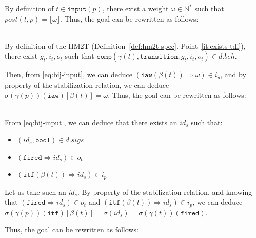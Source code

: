 \begin{itemize}
\begin{enumerate}
   \noindent{}By definition of $t\in{}\mathtt{input}(p)$, there exist
   a weight $\omega\in\mathbb{N}^{*}$ such that
   $post(t,p)=\lfloor\omega\rfloor$.  Thus, the goal can be rewritten
   as follows:
        
   \\

   By definition of the HM2T (Definition~\ref{def:hm2t-spec},
   Point~\ref{it:exists-tdi}), there exist $g_t,i_t,o_t$ such that
   $\mathtt{comp}(\gamma(t),\mathtt{transition}, g_t, i_t,
   o_t)\in{}d.beh$. 
   
   Then, from \eqref{eq:bij-input}, we can deduce
   $(\mathtt{iaw}(\beta(t))\Rightarrow{}\omega)\in{}i_p$, and by
   property of the stabilization relation, we can deduce
   $\sigma(\gamma(p))(\texttt{iaw})[\beta(t)]=\omega$. Thus, the goal
   can be rewritten as follows:

   \\
   
   From \eqref{eq:bij-input}, we can deduce that there exists an
   $id_s$ such that:
   \begin{itemize}
   \item $(id_s,\mathtt{bool})\in{}d.sigs$
   \item $(\mathtt{fired}\Rightarrow{}id_s)\in{}o_t$
   \item $(\mathtt{itf}(\beta(t))\Rightarrow{}id_s)\in{}i_p$
   \end{itemize}
      
   Let us take such an $id_s$. By property of the stabilization
   relation, and knowing that
   $(\mathtt{fired}\Rightarrow{}id_s)\in{}o_t$ and
   $(\mathtt{itf}(\beta(t))\Rightarrow{}id_s)\in{}i_p$, we can deduce
   $\sigma(\gamma(p))(\texttt{itf})[\beta(t)]=\sigma(id_s)=\sigma(\gamma(t))(\texttt{fired})$.

   \noindent{}Thus, the goal can be rewritten as follows:


\end{enumerate}
\end{itemize}
